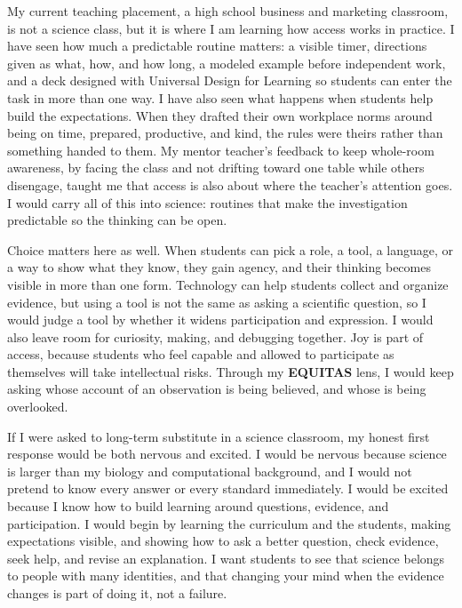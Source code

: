 \documentclass[11pt]{article}
\newcommand{\reviewsection}[1]{%
  \par\Needspace{4\baselineskip}\addvspace{0.10in}%
  \noindent{\large\bfseries\color{PrimaryRed}#1}\par
  \vspace{0.025in}%
}
\begin{document}
My current teaching placement, a high school business and marketing classroom, is not a science class, but it is where I am learning how access works in practice. I have seen how much a predictable routine matters: a visible timer, directions given as what, how, and how long, a modeled example before independent work, and a deck designed with Universal Design for Learning so students can enter the task in more than one way. I have also seen what happens when students help build the expectations. When they drafted their own workplace norms around being on time, prepared, productive, and kind, the rules were theirs rather than something handed to them. My mentor teacher's feedback to keep whole-room awareness, by facing the class and not drifting toward one table while others disengage, taught me that access is also about where the teacher's attention goes. I would carry all of this into science: routines that make the investigation predictable so the thinking can be open.

Choice matters here as well. When students can pick a role, a tool, a language, or a way to show what they know, they gain agency, and their thinking becomes visible in more than one form. Technology can help students collect and organize evidence, but using a tool is not the same as asking a scientific question, so I would judge a tool by whether it widens participation and expression. I would also leave room for curiosity, making, and debugging together. Joy is part of access, because students who feel capable and allowed to participate as themselves will take intellectual risks. Through my \textbf{EQUITAS} lens, I would keep asking whose account of an observation is being believed, and whose is being overlooked.

If I were asked to long-term substitute in a science classroom, my honest first response would be both nervous and excited. I would be nervous because science is larger than my biology and computational background, and I would not pretend to know every answer or every standard immediately. I would be excited because I know how to build learning around questions, evidence, and participation. I would begin by learning the curriculum and the students, making expectations visible, and showing how to ask a better question, check evidence, seek help, and revise an explanation. I want students to see that science belongs to people with many identities, and that changing your mind when the evidence changes is part of doing it, not a failure.

\reviewsection{What I Want to Carry Into the Reading}
\end{document}
